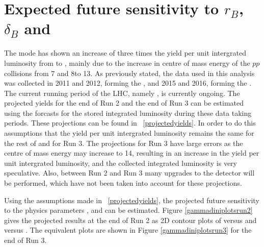 \section{Expected future sensitivity to $r_B$, $\delta_B$ and \Pgamma}
\label{sec:interpretation:futuresensitivity}

The \btodkst mode has shown an increase of three times the yield per unit intergrated luminosity from \runone to \runtwo, mainly due to the increase in centre of mass energy of the $pp$ collisions from 7 and 8\tev to 13\tev. As previously stated, the data used in this analysis was collected in 2011 and 2012, forming the \runone \dataset, and 2015 and 2016, forming the \runtwo \dataset. The current running period of the LHC, namely \runtwo, is currently ongoing. The projected yields for the end of Run 2 and the end of Run 3 can be estimated using the forcasts for the stored integrated luminosity during these data taking periods. These projections can be found in \tab~\ref{projectedyields}. In order to do this assumptions that the yield per unit intergrated luminosity remains the same for the rest of \runtwo and for Run 3. The projections for Run 3 have large errors as the centre of mass energy may increase to 14\tev, resulting in an increase in the yield per unit intergrated luminosity, and the collected integrated luminosity is very speculative. Also, between Run 2 and Run 3 many upgrades to the detector will be performed, which have not been taken into account for these projections.

\begin{table}
\caption{Projected yields}
\label{projectedyields}
\end{table}

Using the assumptions made in \tab~\ref{projectedyields}, the projected future sensitivity to the physics parameters \rb, \deltab and \Pgamma can be estimated. Figure \ref{gammadiniplotsrun2} gives the projected results at the end of Run 2 as 2D contour plots of \rb versus \Pgamma and \deltab versus \Pgamma. The equivalent plots are shown in Figure \ref{gammadiniplotsrun3} for the end of Run 3. 

